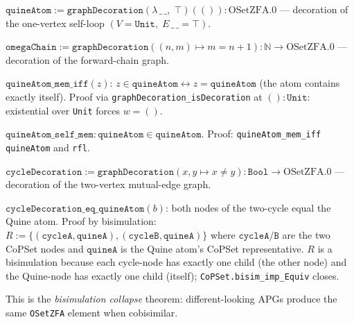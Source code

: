 \begin{definition}
\label{def:quineAtom}
\leanok
{}
$\texttt{quineAtom} := \texttt{graphDecoration}(\lambda\,\_\,\_,\; \top)(())
: \mathrm{OSetZFA}.{0}$
--- decoration of the one-vertex self-loop $(V = \texttt{Unit},\;
E\,\_\,\_ = \top)$.

$\texttt{omegaChain} := \texttt{graphDecoration}((n, m) \mapsto m = n+1)
: \mathbb{N} \to \mathrm{OSetZFA}.{0}$
--- decoration of the forward-chain graph.
\end{definition}

\begin{theorem}
\label{thm:quineAtom_self_mem}
\leanok
{}
$\texttt{quineAtom\_mem\_iff}(z)$: $z \in \texttt{quineAtom}
\leftrightarrow z = \texttt{quineAtom}$ (the atom contains exactly itself).
Proof via \texttt{graphDecoration\_isDecoration} at $() : \texttt{Unit}$:
existential over \texttt{Unit} forces $w = ()$.

$\texttt{quineAtom\_self\_mem} : \texttt{quineAtom} \in \texttt{quineAtom}$.
Proof: \texttt{quineAtom\_mem\_iff quineAtom} and \texttt{rfl}.
\end{theorem}

\begin{theorem}[Bisimulation collapse: two-cycle = Quine atom]
\label{thm:cycleDecoration_eq_quineAtom}
\leanok
{}
$\texttt{cycleDecoration} := \texttt{graphDecoration}(x, y \mapsto x \ne y)
: \texttt{Bool} \to \mathrm{OSetZFA}.{0}$
--- decoration of the two-vertex mutual-edge graph.

$\texttt{cycleDecoration\_eq\_quineAtom}(b)$: both nodes of the two-cycle
equal the Quine atom.  Proof by bisimulation:
$R := \{(\texttt{cycleA}, \texttt{quineA}), (\texttt{cycleB}, \texttt{quineA})\}$
where $\texttt{cycleA/B}$ are the two CoPSet nodes and $\texttt{quineA}$
is the Quine atom's CoPSet representative.  $R$ is a bisimulation because
each cycle-node has exactly one child (the other node) and the Quine-node
has exactly one child (itself); \texttt{CoPSet.bisim\_imp\_Equiv} closes.

This is the \emph{bisimulation collapse} theorem: different-looking APGs
produce the same \texttt{OSetZFA} element when cobisimilar.
\end{theorem}

